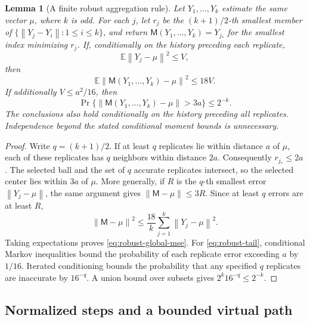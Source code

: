 \documentclass[11pt,a4paper]{article}
\newcommand{\E}{\mathbb{E}}
\newcommand{\norm}[1]{\left\lVert #1\right\rVert}
\newtheorem{lemma}[theorem]{Lemma}
\theoremstyle{remark}
\begin{document}
\begin{lemma}[A finite robust aggregation rule]
\label{lem:robust-center}
Let $Y_1,\ldots,Y_k$ estimate the same vector $\mu$, where $k$ is odd.
For each $j$, let $r_j$ be the $(k+1)/2$-th smallest member of
$\{\norm{Y_j-Y_i}:1\le i\le k\}$, and return
$\mathsf M(Y_1,\ldots,Y_k)=Y_{j_*}$ for the smallest index minimizing $r_j$.
If, conditionally on the history preceding each replicate,
\[
 \E\norm{Y_j-\mu}^2\le V,
\]
then
\begin{equation}
 \E\norm{\mathsf M(Y_1,\ldots,Y_k)-\mu}^2\le18V.
 \label{eq:robust-global-mse}
\end{equation}
If additionally $V\le a^2/16$, then
\begin{equation}
 \Pr\{\norm{\mathsf M(Y_1,\ldots,Y_k)-\mu}>3a\}
 \le2^{-k}.
 \label{eq:robust-tail}
\end{equation}
The conclusions also hold conditionally on the history preceding all
replicates.  Independence beyond the stated conditional moment bounds is
unnecessary.
\end{lemma}

\begin{proof}
Write $q=(k+1)/2$.  If at least $q$ replicates lie within distance $a$ of
$\mu$, each of these replicates has $q$ neighbors within distance $2a$.
Consequently $r_{j_*}\le2a$.  The selected ball and the set of $q$ accurate
replicates intersect, so the selected center lies within $3a$ of $\mu$.
More generally, if $R$ is the $q$-th smallest error
$\norm{Y_j-\mu}$, the same argument gives
$\norm{\mathsf M-\mu}\le3R$.  Since at least $q$ errors are at least $R$,
\[
 \norm{\mathsf M-\mu}^2
 \le \frac{18}{k}\sum_{j=1}^k\norm{Y_j-\mu}^2.
\]
Taking expectations proves \eqref{eq:robust-global-mse}.
For \eqref{eq:robust-tail}, conditional Markov inequalities bound the
probability of each replicate error exceeding $a$ by $1/16$.  Iterated
conditioning bounds the probability that any specified $q$ replicates are
inaccurate by $16^{-q}$.  A union bound over subsets gives
$2^k16^{-q}\le2^{-k}$.
\end{proof}

\subsection{Normalized steps and a bounded virtual path}
\end{document}
